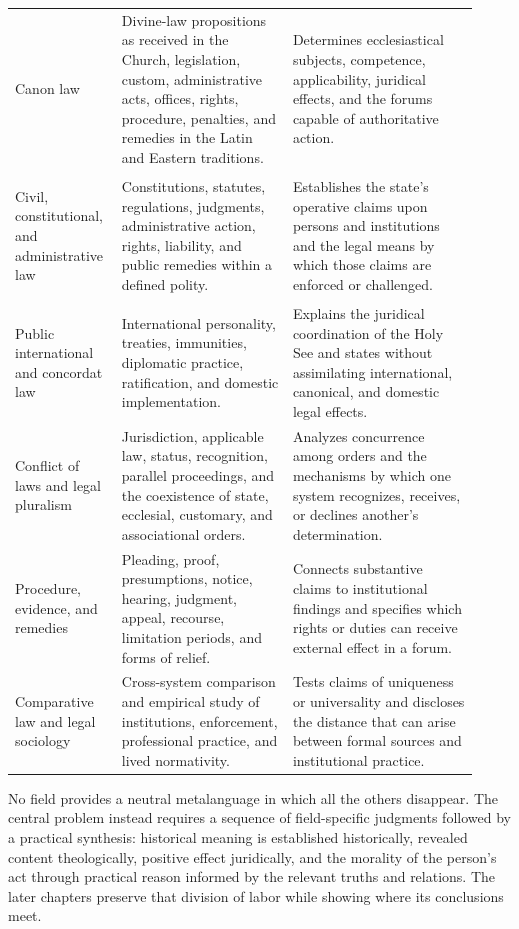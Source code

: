 \begin{longtable}{>{\bfseries\raggedright\arraybackslash}p{0.19\linewidth}>{\raggedright\arraybackslash}p{0.35\linewidth}>{\raggedright\arraybackslash}p{0.38\linewidth}}
Canon law & Divine-law propositions as received in the Church, legislation, custom, administrative acts, offices, rights, procedure, penalties, and remedies in the Latin and Eastern traditions. & Determines ecclesiastical subjects, competence, applicability, juridical effects, and the forums capable of authoritative action.\\
Civil, constitutional, and administrative law & Constitutions, statutes, regulations, judgments, administrative action, rights, liability, and public remedies within a defined polity. & Establishes the state's operative claims upon persons and institutions and the legal means by which those claims are enforced or challenged.\\
Public international and concordat law & International personality, treaties, immunities, diplomatic practice, ratification, and domestic implementation. & Explains the juridical coordination of the Holy See and states without assimilating international, canonical, and domestic legal effects.\\
Conflict of laws and legal pluralism & Jurisdiction, applicable law, status, recognition, parallel proceedings, and the coexistence of state, ecclesial, customary, and associational orders. & Analyzes concurrence among orders and the mechanisms by which one system recognizes, receives, or declines another's determination.\\
Procedure, evidence, and remedies & Pleading, proof, presumptions, notice, hearing, judgment, appeal, recourse, limitation periods, and forms of relief. & Connects substantive claims to institutional findings and specifies which rights or duties can receive external effect in a forum.\\
Comparative law and legal sociology & Cross-system comparison and empirical study of institutions, enforcement, professional practice, and lived normativity. & Tests claims of uniqueness or universality and discloses the distance that can arise between formal sources and institutional practice.\\
\bottomrule
\end{longtable}

No field provides a neutral metalanguage in which all the others disappear. The central problem instead requires a sequence of field-specific judgments followed by a practical synthesis: historical meaning is established historically, revealed content theologically, positive effect juridically, and the morality of the person's act through practical reason informed by the relevant truths and relations. The later chapters preserve that division of labor while showing where its conclusions meet.
